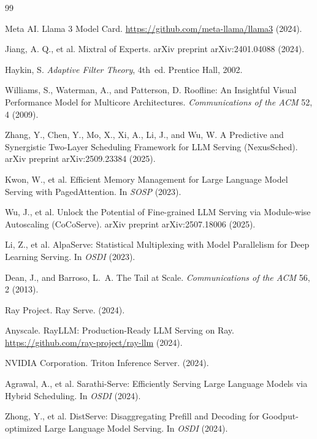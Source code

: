 \documentclass[10pt,twocolumn,letterpaper]{article}
\begin{document}
\FloatBarrier
\begin{thebibliography}{99}

Meta AI.
Llama 3 Model Card.
\url{https://github.com/meta-llama/llama3} (2024).

Jiang, A. Q., et al.
Mixtral of Experts.
arXiv preprint arXiv:2401.04088 (2024).

Haykin, S.
\emph{Adaptive Filter Theory}, 4th~ed.
Prentice Hall, 2002.

Williams, S., Waterman, A., and Patterson, D.
Roofline: An Insightful Visual Performance Model for Multicore Architectures.
\emph{Communications of the ACM} 52, 4 (2009).

Zhang, Y., Chen, Y., Mo, X., Xi, A., Li, J., and Wu, W.
A Predictive and Synergistic Two-Layer Scheduling Framework for LLM Serving (NexusSched).
arXiv preprint arXiv:2509.23384 (2025).

Kwon, W., et al.
Efficient Memory Management for Large Language Model Serving with PagedAttention.
In \emph{SOSP} (2023).

Wu, J., et al.
Unlock the Potential of Fine-grained LLM Serving via Module-wise Autoscaling (CoCoServe).
arXiv preprint arXiv:2507.18006 (2025).

Li, Z., et al.
AlpaServe: Statistical Multiplexing with Model Parallelism for Deep Learning Serving.
In \emph{OSDI} (2023).

Dean, J., and Barroso, L.~A.
The Tail at Scale.
\emph{Communications of the ACM} 56, 2 (2013).

Ray Project.
Ray Serve.
(2024).

Anyscale.
RayLLM: Production-Ready LLM Serving on Ray.
\url{https://github.com/ray-project/ray-llm} (2024).

NVIDIA Corporation.
Triton Inference Server.
(2024).

Agrawal, A., et al.
Sarathi-Serve: Efficiently Serving Large Language Models via Hybrid Scheduling.
In \emph{OSDI} (2024).

Zhong, Y., et al.
DistServe: Disaggregating Prefill and Decoding for Goodput-optimized Large Language Model Serving.
In \emph{OSDI} (2024).


\end{thebibliography}
\end{document}
